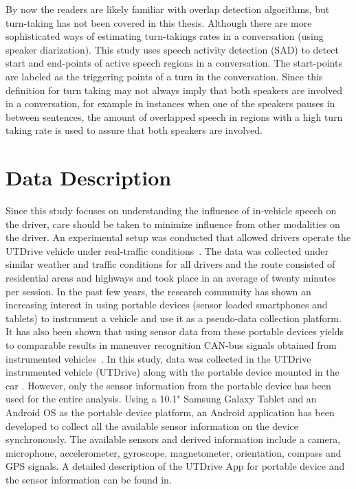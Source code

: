 By now the readers are likely familiar with overlap detection algorithms, but turn-taking has not been covered in this thesis. 
Although there are more sophisticated ways of estimating turn-takings rates in a conversation (using speaker diarization). 
This study uses speech activity detection (SAD) to detect start and end-points of active speech regions in a conversation. 
The start-points are labeled as the triggering points of a turn in the conversation. 
Since this definition for turn taking may not always imply that both speakers are involved in a conversation, for example in instances when one of the speakers pauses in between sentences, the amount of overlapped speech in regions with a high turn taking rate is used to assure that both speakers are involved. 


\vspace{3mm}
\section{Data Description}
\label{sec:data_description}
Since this study focuses on understanding the influence of in-vehicle speech on the driver, care should be taken to minimize influence from other modalities on the driver.  
An experimental setup was conducted that allowed drivers operate the UTDrive vehicle under real-traffic conditions~\cite{pongtep2007utdrive}. 
The data was collected under similar weather and traffic conditions for all drivers and the route consisted of residential areas and highways and took place in an average of twenty minutes per session. 
In the past few years, the research community has shown an increasing interest in using portable devices (sensor loaded smartphones and tablets) to instrument a vehicle and use it as a pseudo-data collection platform. 
It has also been shown that using sensor data from these portable devices yields to comparable results in maneuver recognition CAN-bus signals obtained from instrumented vehicles~\cite{sathyanarayanaITSC2012,sathyanarayanaSAE2013}. 
In this study, data was collected in the UTDrive instrumented vehicle (UTDrive) along with the portable device mounted in the car \cite{sathyanarayanaITSC2012}. However, only the sensor information from the portable device has been used for the entire analysis.
Using a 10.1" Samsung Galaxy Tablet and an Android OS as the portable device platform, an Android application has been developed to collect all the available sensor information on the device synchronously. 
The available sensors and derived information include a camera, microphone, accelerometer, gyroscope, magnetometer, orientation, compass and GPS signals. 
A detailed description of the UTDrive App for portable device and the sensor information can be found in\cite{sathyanarayanaITSC2012}. 


